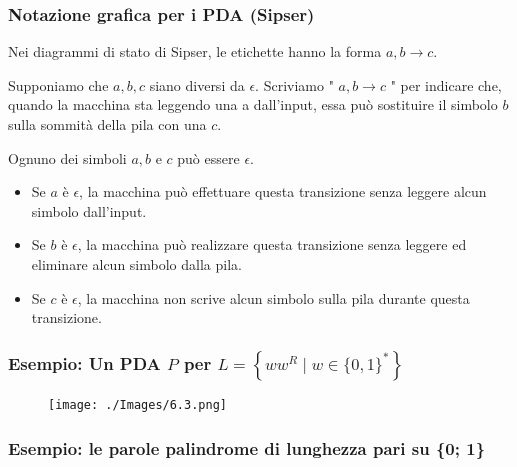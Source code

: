 \subsubsection{Notazione grafica per i PDA (Sipser)}
Nei diagrammi di stato di Sipser, le etichette hanno la forma $a, b \rightarrow c$.

Supponiamo che $a, b, c$ siano diversi da $\epsilon .$ Scriviamo " $a, b \rightarrow c$ " per indicare che, quando la macchina sta leggendo una a dall'input, essa può sostituire il simbolo $b$ sulla sommità della pila con una $c$.

Ognuno dei simboli $a, b$ e $c$ può essere $\epsilon$.
\begin{itemize}
    \item Se $a$ è $\epsilon$, la macchina può effettuare questa transizione senza leggere alcun simbolo dall'input.
    \item Se $b$ è $\epsilon$, la macchina può realizzare questa transizione senza leggere ed eliminare alcun simbolo dalla pila.
    \item Se $c$ è $\epsilon$, la macchina non scrive alcun simbolo sulla pila durante questa transizione.
\end{itemize}

\subsubsection{Esempio: Un PDA $P$ per $L=\left\{w w^{R} \mid w \in\{0,1\}^{*}\right\}$}

\begin{figure}[hbpt!]
    \centering
    \texttt{[image: ./Images/6.3.png]}
\end{figure}
\FloatBarrier

\subsubsection{Esempio:
le parole palindrome di lunghezza pari su \{0; 1\}}

